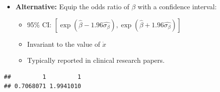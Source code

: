 \documentclass[
  ignorenonframetext,
]{beamer}
\newenvironment{Shaded}{\begin{snugshade}}{\end{snugshade}}
\newcommand{\DataTypeTok}[1]{\textcolor[rgb]{0.13,0.29,0.53}{#1}}
\newcommand{\DecValTok}[1]{\textcolor[rgb]{0.00,0.00,0.81}{#1}}
\newcommand{\FloatTok}[1]{\textcolor[rgb]{0.00,0.00,0.81}{#1}}
\newcommand{\KeywordTok}[1]{\textcolor[rgb]{0.13,0.29,0.53}{\textbf{#1}}}
\newcommand{\NormalTok}[1]{#1}
\newcommand{\OperatorTok}[1]{\textcolor[rgb]{0.81,0.36,0.00}{\textbf{#1}}}
\newcommand{\StringTok}[1]{\textcolor[rgb]{0.31,0.60,0.02}{#1}}
\providecommand{\tightlist}{%
  \setlength{\itemsep}{0pt}\setlength{\parskip}{0pt}}
\begin{document}
\begin{frame}[fragile]

\begin{itemize}
\tightlist
\item
  \textbf{Alternative:} Equip the odds ratio of \(\beta\) with a
  confidence interval:

  \begin{itemize}
  \tightlist
  \item
    95\% CI:
    \([\exp(\hat{\beta}-1.96\hat{\sigma_{\beta}}), \exp(\hat{\beta}+1.96\hat{\sigma_{\beta}})]\)
  \item
    Invariant to the value of \(\dot{x}\)
  \item
    Typically reported in clinical research papers.
  \end{itemize}
\end{itemize}

\tiny

\begin{Shaded}
\end{Shaded}

\begin{verbatim}
##         1         1 
## 0.7068071 1.9941010
\end{verbatim}

\normalsize

\end{frame}
\end{document}

